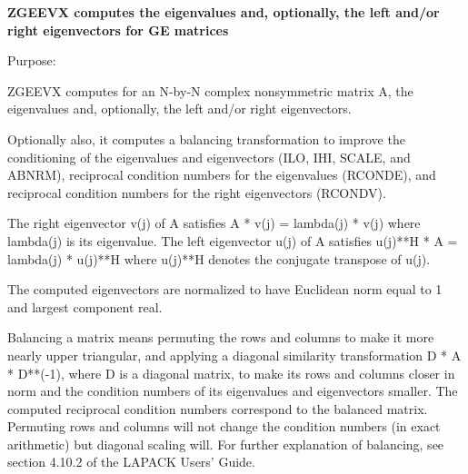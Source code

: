 {\bfseries  Z\+G\+E\+E\+V\+X computes the eigenvalues and, optionally, the left and/or right eigenvectors for G\+E matrices} 

 \begin{DoxyParagraph}{Purpose\+: }
\begin{DoxyVerb} ZGEEVX computes for an N-by-N complex nonsymmetric matrix A, the
 eigenvalues and, optionally, the left and/or right eigenvectors.

 Optionally also, it computes a balancing transformation to improve
 the conditioning of the eigenvalues and eigenvectors (ILO, IHI,
 SCALE, and ABNRM), reciprocal condition numbers for the eigenvalues
 (RCONDE), and reciprocal condition numbers for the right
 eigenvectors (RCONDV).

 The right eigenvector v(j) of A satisfies
                  A * v(j) = lambda(j) * v(j)
 where lambda(j) is its eigenvalue.
 The left eigenvector u(j) of A satisfies
               u(j)**H * A = lambda(j) * u(j)**H
 where u(j)**H denotes the conjugate transpose of u(j).

 The computed eigenvectors are normalized to have Euclidean norm
 equal to 1 and largest component real.

 Balancing a matrix means permuting the rows and columns to make it
 more nearly upper triangular, and applying a diagonal similarity
 transformation D * A * D**(-1), where D is a diagonal matrix, to
 make its rows and columns closer in norm and the condition numbers
 of its eigenvalues and eigenvectors smaller.  The computed
 reciprocal condition numbers correspond to the balanced matrix.
 Permuting rows and columns will not change the condition numbers
 (in exact arithmetic) but diagonal scaling will.  For further
 explanation of balancing, see section 4.10.2 of the LAPACK
 Users' Guide.\end{DoxyVerb}
 
\end{DoxyParagraph}

